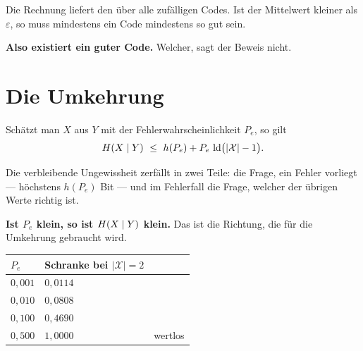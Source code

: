 \begin{merksatz}
\begin{center}
\begin{minipage}{0.88\textwidth}
\end{minipage}
\end{center}

Die Rechnung liefert den  über alle zufälligen Codes. Ist der Mittelwert kleiner als $\varepsilon$, so muss mindestens ein Code mindestens so gut sein.

\begin{center}
\begin{minipage}{0.9\textwidth}
\textbf{Also existiert ein guter Code.} Welcher, sagt der Beweis nicht.
\end{minipage}
\end{center}
\end{merksatz}

\section{Die Umkehrung}

\begin{merksatz}
Schätzt man $X$ aus $Y$ mit der Fehlerwahrscheinlichkeit $P_e$, so gilt
\[ H(X\mid Y) \ \le\ h(P_e) + P_e\,\operatorname{ld}\bigl(|\mathcal{X}|-1\bigr) . \]

Die verbleibende Ungewissheit zerfällt in zwei Teile: die Frage,  ein Fehler vorliegt --- höchstens $h(P_e)$ Bit --- und im Fehlerfall die Frage, welcher der übrigen Werte richtig ist.

\begin{center}
\begin{minipage}{0.9\textwidth}
\textbf{Ist $P_e$ klein, so ist $H(X\mid Y)$ klein.} Das ist die Richtung, die für die Umkehrung gebraucht wird.
\end{minipage}
\end{center}

\begin{center}
{\small
\renewcommand{\arraystretch}{1.46}
\begin{tabular}{@{}P{2.0cm}P{2.6cm}P{2.4cm}@{}}
\toprule
$P_e$ & \textbf{Schranke bei $|\mathcal{X}|=2$} & \\
\midrule
$0{,}001$ & $0{,}0114$ & \\
$0{,}010$ & $0{,}0808$ & \\
$0{,}100$ & $0{,}4690$ & \\
$0{,}500$ & $1{,}0000$ & wertlos\\
\bottomrule
\end{tabular}}
\end{center}
\end{merksatz}

